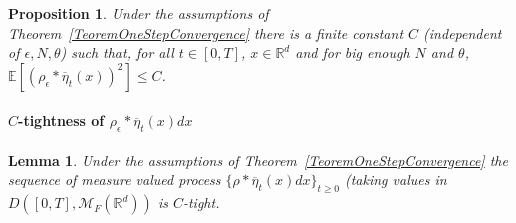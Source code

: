 \documentclass[12pt]{article}
\newtheorem{lemma}[theorem]{Lemma}
\newtheorem{proposition}[theorem]{Proposition}
\newcommand{\IE}{\mathbb E}
\begin{document}
\begin{proposition}
Under the assumptions of Theorem~\ref{TeoremOneStepConvergence} there is a finite constant $C$ (independent of $\epsilon, N, \theta$) such that, for all $t \in [0,T]$, $x \in \mathbb{R}^d$ and for big enough $N$ and $\theta$, $\IE[ (\rho_\epsilon*\overline{\eta}_t(x))^2] \leq C$.\label{Prop:SecondMomentDensity}
\end{proposition} 


\paragraph{$C$-tightness of $\rho_\epsilon * \overline{\eta}_t(x) dx$ }
\begin{lemma}
Under the assumptions of Theorem~\ref{TeoremOneStepConvergence} the sequence of measure valued process $\{ \rho*\overline{\eta}_t(x) dx \}_{t \geq 0}$ (taking values in $D([0,T], \mathcal{M}_F(\mathbb{R}^d))$ is $C$-tight.
\end{lemma}
\end{document}
